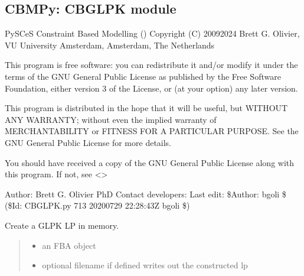 \documentclass[letterpaper,12pt,english]{sphinxmanual}
\begin{document}
\subsection{CBMPy: CBGLPK module}
\label{\detokenize{api/solvers:cbmpy-cbglpk-module}}\label{\detokenize{api/solvers:module-cbmpy.CBGLPK}}
\sphinxAtStartPar
PySCeS Constraint Based Modelling ()
Copyright (C) 2009\sphinxhyphen{}2024 Brett G. Olivier, VU University Amsterdam, Amsterdam, The Netherlands

\sphinxAtStartPar
This program is free software: you can redistribute it and/or modify
it under the terms of the GNU General Public License as published by
the Free Software Foundation, either version 3 of the License, or
(at your option) any later version.

\sphinxAtStartPar
This program is distributed in the hope that it will be useful,
but WITHOUT ANY WARRANTY; without even the implied warranty of
MERCHANTABILITY or FITNESS FOR A PARTICULAR PURPOSE.  See the
GNU General Public License for more details.

\sphinxAtStartPar
You should have received a copy of the GNU General Public License
along with this program.  If not, see \textless{}\textgreater{}

\sphinxAtStartPar
Author: Brett G. Olivier PhD
Contact developers: 
Last edit: \$Author: bgoli \$ (\$Id: CBGLPK.py 713 2020\sphinxhyphen{}07\sphinxhyphen{}29 22:28:43Z bgoli \$)

\begin{fulllineitems}
\label{\detokenize{api/solvers:cbmpy.CBGLPK.glpk_constructLPfromFBA}}
\pysigstartsignatures
\pysiglinewithargsret
{}
{\sphinxparamcomma {}}
{}
\pysigstopsignatures
\sphinxAtStartPar
Create a GLPK LP in memory.
\begin{quote}\begin{description}
\begin{itemize}
\item {} 
\sphinxAtStartPar
{} \textendash{} an FBA object

\item {} 
\sphinxAtStartPar
{} \textendash{} optional filename if defined writes out the constructed lp

\end{itemize}

\end{description}\end{quote}

\end{fulllineitems}
\end{document}
